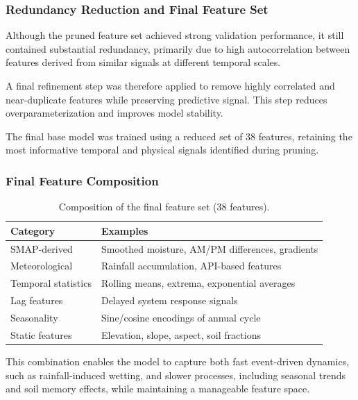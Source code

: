\subsubsection*{Redundancy Reduction and Final Feature Set}

Although the pruned feature set achieved strong validation performance, it still contained substantial redundancy, primarily due to high autocorrelation between features derived from similar signals at different temporal scales.

A final refinement step was therefore applied to remove highly correlated and near-duplicate features while preserving predictive signal. This step reduces overparameterization and improves model stability.

The final base model was trained using a reduced set of 38 features, retaining the most informative temporal and physical signals identified during pruning.

\subsubsection*{Final Feature Composition}

\begin{table}[H]
\centering
\begin{tabular}{ll}
\toprule
\textbf{Category} & \textbf{Examples} \\
\midrule
SMAP-derived & Smoothed moisture, AM/PM differences, gradients \\
Meteorological & Rainfall accumulation, API-based features \\
Temporal statistics & Rolling means, extrema, exponential averages \\
Lag features & Delayed system response signals \\
Seasonality & Sine/cosine encodings of annual cycle \\
Static features & Elevation, slope, aspect, soil fractions \\
\bottomrule
\end{tabular}
\caption{Composition of the final feature set (38 features).}
\end{table}

This combination enables the model to capture both fast event-driven dynamics, such as rainfall-induced wetting, and slower processes, including seasonal trends and soil memory effects, while maintaining a manageable feature space.
